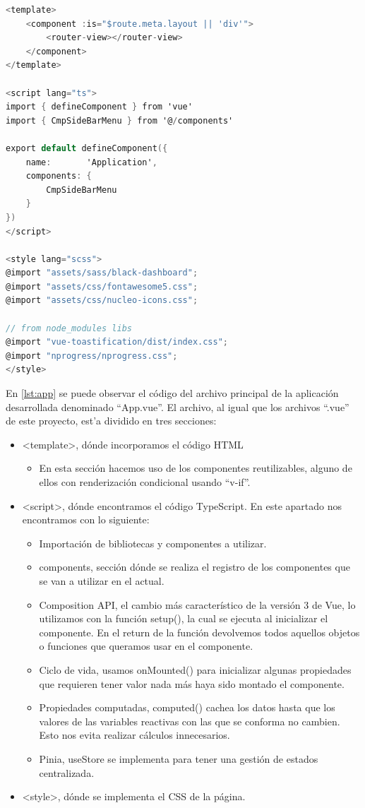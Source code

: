 \begin{lstlisting}[language=C,caption={Código del archivo App.vue}, label={lst:app}]
<template>
    <component :is="$route.meta.layout || 'div'">
        <router-view></router-view>
    </component>
</template>

<script lang="ts">
import { defineComponent } from 'vue'
import { CmpSideBarMenu } from '@/components'

export default defineComponent({
    name:       'Application',
    components: {
        CmpSideBarMenu
    }
})
</script>

<style lang="scss">
@import "assets/sass/black-dashboard";
@import "assets/css/fontawesome5.css";
@import "assets/css/nucleo-icons.css";

// from node_modules libs
@import "vue-toastification/dist/index.css";
@import "nprogress/nprogress.css";
</style>
\end{lstlisting}

En \ref{lst:app} se puede observar el código del archivo principal de la aplicación desarrollada denominado ``App.vue''. El archivo, al igual que los archivos ``.vue'' de este proyecto, est'a dividido en tres secciones:
\begin{itemize}
\item <template>, dónde incorporamos el código HTML
\begin{itemize}
\item En esta sección hacemos uso de los componentes reutilizables, alguno de ellos con renderización condicional usando ``v-if''.
\end{itemize}
\item <script>, dónde encontramos el código TypeScript. En este apartado nos encontramos con lo siguiente:
\begin{itemize}
\item Importación de bibliotecas y componentes a utilizar.
\item components, sección dónde se realiza el registro de los componentes que se van a utilizar en el actual.
\item Composition API, el cambio más característico de la versión 3 de Vue, lo utilizamos con la función setup(), la cual se ejecuta al inicializar el componente. En el return de la función devolvemos todos aquellos objetos o funciones que queramos usar en el componente.
\item Ciclo de vida, usamos onMounted() para inicializar algunas propiedades que requieren tener valor nada más haya sido montado el componente.
\item Propiedades computadas, computed() cachea los datos hasta que los valores de las variables reactivas con las que se conforma no cambien. Esto nos evita realizar cálculos innecesarios.
\item Pinia, useStore se implementa para tener una gestión de estados centralizada.
\end{itemize}
\item <style>, dónde se implementa el CSS de la página.
\end{itemize}

